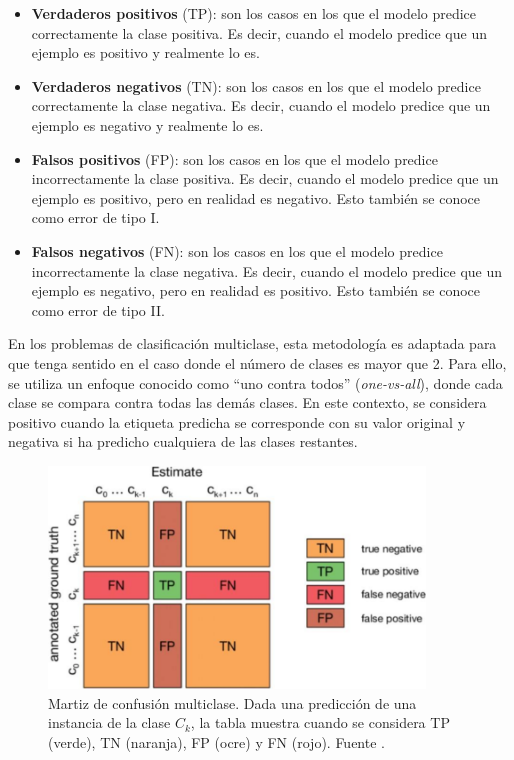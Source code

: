 \begin{itemize}
	\item \textbf{Verdaderos positivos} (TP): son los casos en los que el modelo predice
	correctamente la clase positiva. Es decir, cuando el modelo predice que un ejemplo
	es positivo y realmente lo es.
	
	\item \textbf{Verdaderos negativos} (TN): son los casos en los que el modelo predice
	correctamente la clase negativa. Es decir, cuando el modelo predice que un ejemplo
	es negativo y realmente lo es.
	
	\item \textbf{Falsos positivos} (FP): son los casos en los que el modelo predice
	incorrectamente la clase positiva. Es decir, cuando el modelo predice que un
	ejemplo es positivo, pero en realidad es negativo. Esto también se conoce como
	error de tipo I.
	
	\item \textbf{Falsos negativos} (FN): son los casos en los que el modelo predice
	incorrectamente la clase negativa. Es decir, cuando el modelo predice que un
	ejemplo es negativo, pero en realidad es positivo. Esto también se conoce como
	error de tipo II.
\end{itemize}

En los problemas de clasificación multiclase, esta metodología es adaptada para que
tenga sentido en el caso donde el número de clases es mayor que 2. Para ello, se
utiliza un enfoque conocido como \enquote{uno contra todos} (\textit{one-vs-all}),
donde cada clase se compara contra todas las demás clases. En este contexto, se considera
positivo cuando la etiqueta predicha se corresponde con su valor original y negativa
si ha predicho cualquiera de las clases restantes.

\begin{figure}[h]
	\centering
	\includegraphics[width=100mm]{img/confusion-matrix.png}
	\caption{Martiz de confusión multiclase. Dada una predicción de una instancia de
		la clase $C_{k}$, la tabla muestra cuando se considera TP (verde), TN (naranja),
		FP (ocre) y FN (rojo). Fuente \cite{venkataramana2023}.}
	\label{fig:confusion-matrix}
\end{figure}

